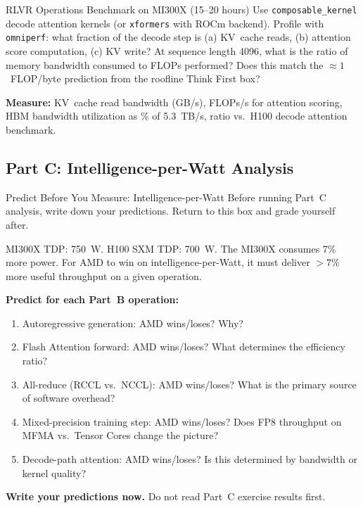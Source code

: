 \begin{exercise}{RLVR Operations Benchmark on MI300X (15--20 hours)}
Use \texttt{composable\_kernel} decode attention kernels (or \texttt{xformers} with ROCm backend). Profile with \texttt{omniperf}: what fraction of the decode step is (a) KV~cache reads, (b) attention score computation, (c) KV write? At sequence length 4096, what is the ratio of memory bandwidth consumed to FLOPs performed? Does this match the $\approx 1$~FLOP/byte prediction from the roofline Think First box?

\textbf{Measure:} KV~cache read bandwidth (GB/s), FLOPs/s for attention scoring, HBM bandwidth utilization as \% of 5.3~TB/s, ratio vs.\ H100 decode attention benchmark.
\end{exercise}

\subsection{Part C: Intelligence-per-Watt Analysis}

\begin{thinkfirst}{Predict Before You Measure: Intelligence-per-Watt}
Before running Part~C analysis, write down your predictions. Return to this box and grade yourself after.

MI300X TDP: 750~W. H100 SXM TDP: 700~W. The MI300X consumes 7\% more power. For AMD to win on intelligence-per-Watt, it must deliver $>7\%$ more useful throughput on a given operation.

\textbf{Predict for each Part~B operation:}
\begin{enumerate}
  \item Autoregressive generation: AMD wins/loses? Why?
  \item Flash Attention forward: AMD wins/loses? What determines the efficiency ratio?
  \item All-reduce (RCCL vs.\ NCCL): AMD wins/loses? What is the primary source of software overhead?
  \item Mixed-precision training step: AMD wins/loses? Does FP8 throughput on MFMA vs.\ Tensor Cores change the picture?
  \item Decode-path attention: AMD wins/loses? Is this determined by bandwidth or kernel quality?
\end{enumerate}

\textbf{Write your predictions now.} Do not read Part~C exercise results first.
\end{thinkfirst}

